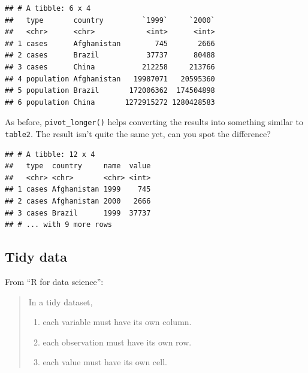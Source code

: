 \documentclass[]{book}
\newenvironment{Shaded}{}{}
\newcommand{\DataTypeTok}[1]{#1}
\newcommand{\KeywordTok}[1]{\textcolor[rgb]{0.00,0.00,1.00}{#1}}
\newcommand{\NormalTok}[1]{#1}
\newcommand{\OperatorTok}[1]{#1}
\newcommand{\StringTok}[1]{\textcolor[rgb]{0.00,0.50,0.50}{#1}}
\providecommand{\tightlist}{%
  \setlength{\itemsep}{0pt}\setlength{\parskip}{0pt}}
\begin{document}
\begin{verbatim}
## # A tibble: 6 x 4
##   type       country         `1999`     `2000`
##   <chr>      <chr>            <int>      <int>
## 1 cases      Afghanistan        745       2666
## 2 cases      Brazil           37737      80488
## 3 cases      China           212258     213766
## 4 population Afghanistan   19987071   20595360
## 5 population Brazil       172006362  174504898
## 6 population China       1272915272 1280428583
\end{verbatim}

As before, \texttt{pivot\_longer()} helps converting the results into something similar to \texttt{table2}.
The result isn't quite the same yet, can you spot the difference?

\begin{Shaded}
\end{Shaded}

\begin{verbatim}
## # A tibble: 12 x 4
##   type  country     name  value
##   <chr> <chr>       <chr> <int>
## 1 cases Afghanistan 1999    745
## 2 cases Afghanistan 2000   2666
## 3 cases Brazil      1999  37737
## # ... with 9 more rows
\end{verbatim}

\hypertarget{tidy-data}{%
\subsection{Tidy data}\label{tidy-data}}

From ``R for data science'':

\begin{quote}
In a tidy dataset,

\begin{enumerate}
\def\labelenumi{\arabic{enumi}.}
\tightlist
\item
  each variable must have its own column.
\item
  each observation must have its own row.
\item
  each value must have its own cell.
\end{enumerate}
\end{quote}
\end{document}
